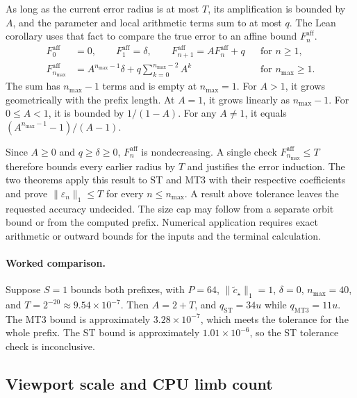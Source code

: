 As long as the current error radius is at most \(T\), its amplification is
bounded by \(A\), and the parameter and local arithmetic terms sum to at
most \(q\). The Lean corollary 
uses that fact to compare the true error to an affine bound \(F_n^{\mathrm{aff}}\).
\begin{equation}
\begin{aligned}
  F_0^{\mathrm{aff}}&=0, \qquad F_1^{\mathrm{aff}}=\delta, \qquad
  F_{n+1}^{\mathrm{aff}}=A F_n^{\mathrm{aff}}+q
       &&\text{for } n\ge1,\\
  F_{n_{\max}}^{\mathrm{aff}}
     &= A^{n_{\max}-1}\delta+
        q\sum_{k=0}^{n_{\max}-2} A^k
       &&\text{for } n_{\max}\ge1 .
\end{aligned}
\label{eq:reference-orbit-proof-tolerance}
\end{equation}
The sum has \(n_{\max}-1\) terms and is empty at \(n_{\max}=1\).
For \(A>1\), it grows geometrically with the prefix length. At \(A=1\),
it grows linearly as \(n_{\max}-1\). For \(0\le A<1\), it is bounded by
\(1/(1-A)\). For any \(A\ne1\), it equals \((A^{n_{\max}-1}-1)/(A-1)\).

Since \(A\ge0\) and \(q\ge\delta\ge0\), \(F_n^{\mathrm{aff}}\) is nondecreasing.
A single check \(F_{n_{\max}}^{\mathrm{aff}}\le T\) therefore bounds every earlier radius by \(T\)
and justifies the error induction. The two
 theorems apply this result to ST and
MT3 with their respective coefficients and prove
\(\lVert\varepsilon_n\rVert_1\le T\) for every \(n\le n_{\max}\).
A result above tolerance leaves the requested accuracy undecided. The size
cap may follow from a separate orbit bound or from the computed prefix.
Numerical application requires exact
arithmetic or outward bounds for the inputs and the terminal calculation.

\paragraph{Worked comparison.}
Suppose \(S=1\) bounds both prefixes, with \(P=64\),
\(\lVert\widetilde c_\star\rVert_1=1\), \(\delta=0\), \(n_{\max}=40\), and
\(T=2^{-20}\approx9.54\times10^{-7}\). Then \(A=2+T\), and
\(q_{\mathrm{ST}}=34u\) while \(q_{\mathrm{MT3}}=11u\).
The MT3 bound is approximately \(3.28\times10^{-7}\), which meets
the tolerance for the whole prefix. The ST bound is approximately
\(1.01\times10^{-6}\), so the ST tolerance check is inconclusive.

\subsection{Viewport scale and CPU limb count}
\label{subsec:reference-orbit-proof-viewport}

